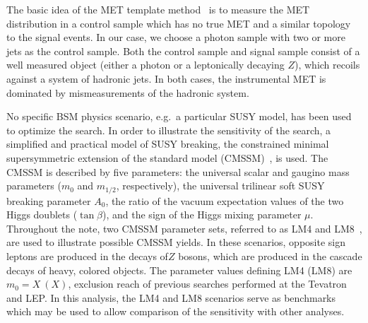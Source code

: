 The       basic       idea       of       the       MET       template
method~\cite{ref:templates1}\cite{ref:templates2}  is  to measure  the
MET  distribution in  a control  sample which  has no  true MET  and a
similar  topology to  the signal  events.  In  our case,  we  choose a
photon sample with  two or more jets as the  control sample.  Both the
control sample  and signal  sample consist of  a well  measured object
(either  a  photon or  a  leptonically  decaying  $Z$), which  recoils
against a  system of hadronic  jets.  In both cases,  the instrumental
MET is dominated by mismeasurements of the hadronic system.

No specific BSM  physics scenario, e.g.\ a particular  SUSY model, has
been  used  to  optimize  the  search.  In  order  to  illustrate  the
sensitivity of  the search, a  simplified and practical model  of SUSY
breaking,  the  constrained minimal  supersymmetric  extension of  the
standard  model  (CMSSM)~\cite{CMSSM,CMSSM2}, is  used.  The CMSSM  is
described by  five parameters: the  universal scalar and  gaugino mass
parameters   ($m_0$  and   $m_{1/2}$,  respectively),   the  universal
trilinear soft SUSY breaking parameter  $A_0$, the ratio of the vacuum
expectation values  of the two  Higgs doublets ($\tan\beta$),  and the
sign of  the Higgs mixing  parameter $\mu$.  Throughout the  note, two
CMSSM parameter sets, referred to  as LM4 and LM8~\cite{TDR}, are used
to  illustrate possible  CMSSM yields.   In these  scenarios, opposite
sign  leptons are  produced  in  the decays  of$Z$  bosons, which  are
produced  in  the  cascade  decays  of heavy,  colored  objects.   The
parameter  values defining  LM4  (LM8) are  $m_0  = X~(X)$\GeVcc,
exclusion  reach of previous  searches performed  at the  Tevatron and
LEP.  In this analysis, the  LM4 and LM8 scenarios serve as benchmarks
which may  be used to allow  comparison of the  sensitivity with other
analyses.
